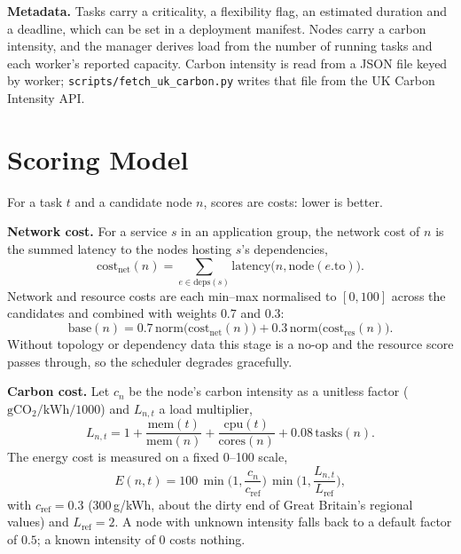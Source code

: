 \documentclass[conference]{IEEEtran}
\begin{document}
\textbf{Metadata.} Tasks carry a criticality, a flexibility flag, an estimated duration and a deadline, which can be set in a deployment manifest. Nodes carry a carbon intensity, and the manager derives load from the number of running tasks and each worker's reported capacity. Carbon intensity is read from a JSON file keyed by worker; \texttt{scripts/fetch\_uk\_carbon.py} writes that file from the UK Carbon Intensity API.

\section{Scoring Model}
\label{sec:model}
For a task $t$ and a candidate node $n$, scores are costs: lower is better.

\textbf{Network cost.} For a service $s$ in an application group, the network cost of $n$ is the summed latency to the nodes hosting $s$'s dependencies,
\begin{equation}
\mathrm{cost}_{\mathrm{net}}(n)=\sum_{e\in\mathrm{deps}(s)}\mathrm{latency}\big(n,\mathrm{node}(e.\mathrm{to})\big).
\label{eq:net}
\end{equation}
Network and resource costs are each min--max normalised to $[0,100]$ across the candidates and combined with weights $0.7$ and $0.3$:
\begin{equation}
\mathrm{base}(n)=0.7\,\mathrm{norm}\big(\mathrm{cost}_{\mathrm{net}}(n)\big)+0.3\,\mathrm{norm}\big(\mathrm{cost}_{\mathrm{res}}(n)\big).
\label{eq:base}
\end{equation}
Without topology or dependency data this stage is a no-op and the resource score passes through, so the scheduler degrades gracefully.

\textbf{Carbon cost.} Let $c_n$ be the node's carbon intensity as a unitless factor ($\mathrm{gCO_2/kWh}/1000$) and $L_{n,t}$ a load multiplier,
\begin{equation}
L_{n,t}=1+\frac{\mathrm{mem}(t)}{\mathrm{mem}(n)}+\frac{\mathrm{cpu}(t)}{\mathrm{cores}(n)}+0.08\,\mathrm{tasks}(n).
\label{eq:load}
\end{equation}
The energy cost is measured on a fixed 0--100 scale,
\begin{equation}
E(n,t)=100\,\min\!\Big(1,\frac{c_n}{c_{\mathrm{ref}}}\Big)\,\min\!\Big(1,\frac{L_{n,t}}{L_{\mathrm{ref}}}\Big),
\label{eq:energy}
\end{equation}
with $c_{\mathrm{ref}}=0.3$ (300\,g/kWh, about the dirty end of Great Britain's regional values) and $L_{\mathrm{ref}}=2$. A node with unknown intensity falls back to a default factor of $0.5$; a known intensity of $0$ costs nothing.
\end{document}
